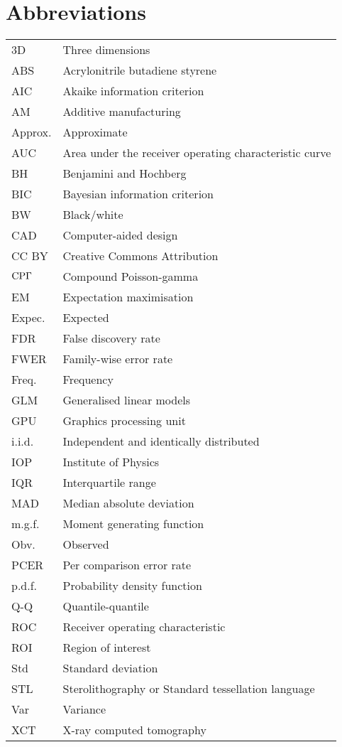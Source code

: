 \chapter{Abbreviations}

\begin{longtable}{ll}
3D&Three dimensions\\
ABS&Acrylonitrile butadiene styrene\\
AIC&Akaike information criterion\\
AM&Additive manufacturing\\
Approx.&Approximate\\
AUC&Area under the receiver operating characteristic curve\\
BH&Benjamini and Hochberg\\
BIC&Bayesian information criterion\\
BW&Black/white\\
CAD&Computer-aided design\\
CC BY&Creative Commons Attribution\\
$\operatorname{CP\Gamma}$&Compound Poisson-gamma\\
EM&Expectation maximisation\\
Expec.&Expected\\
FDR&False discovery rate\\
FWER&Family-wise error rate\\
Freq.&Frequency\\
GLM&Generalised linear models\\
GPU&Graphics processing unit\\
i.i.d.&Independent and identically distributed\\
IOP&Institute of Physics\\
IQR&Interquartile range\\
MAD&Median absolute deviation\\
m.g.f.&Moment generating function\\
Obv.&Observed\\
PCER&Per comparison error rate\\
p.d.f.&Probability density function\\
Q-Q&Quantile-quantile\\
ROC&Receiver operating characteristic\\
ROI&Region of interest\\
Std&Standard deviation\\
STL&Sterolithography or Standard tessellation language\\
Var&Variance\\
XCT&X-ray computed tomography
\end{longtable}


